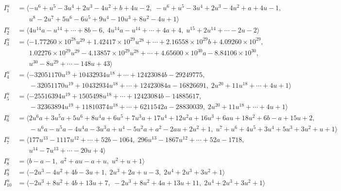 \documentclass[1p]{elsarticle_modified}
\theoremstyle{definition}
\begin{document}
\begin{align*}
I^u_{1}&=\langle 
- u^6+u^5-3 u^4+2 u^3-4 u^2+b+4 u-2,\;- u^6+u^5-3 u^4+2 u^3-4 u^2+a+4 u-1,\\
\phantom{I^u_{1}}&\phantom{= \langle  }u^8-2 u^7+5 u^6-6 u^5+9 u^4-10 u^3+8 u^2-4 u+1\rangle \\
I^u_{2}&=\langle 
4 u^{14} a- u^{14}+\cdots+8 b-6,\;4 u^{14} a- u^{14}+\cdots+4 a+4,\;u^{15}+2 u^{14}+\cdots-2 u-2\rangle \\
I^u_{3}&=\langle 
-1.77260\times10^{28} u^{29}+1.42417\times10^{29} u^{28}+\cdots+2.16558\times10^{29} b+4.09260\times10^{29},\\
\phantom{I^u_{3}}&\phantom{= \langle  }1.02276\times10^{29} u^{29}-4.13857\times10^{29} u^{28}+\cdots+4.65600\times10^{30} a-8.84106\times10^{30},\\
\phantom{I^u_{3}}&\phantom{= \langle  }u^{30}-8 u^{29}+\cdots-148 u+43\rangle \\
I^u_{4}&=\langle 
-32051170 u^{19}+10432934 u^{18}+\cdots+12423084 b-29249775,\\
\phantom{I^u_{4}}&\phantom{= \langle  }-32051170 u^{19}+10432934 u^{18}+\cdots+12423084 a-16826691,\;2 u^{20}+11 u^{18}+\cdots+4 u+1\rangle \\
I^u_{5}&=\langle 
-25516394 u^{19}+1505498 u^{18}+\cdots+12423084 b-14885617,\\
\phantom{I^u_{5}}&\phantom{= \langle  }-32363894 u^{19}+11810374 u^{18}+\cdots+6211542 a-28830039,\;2 u^{20}+11 u^{18}+\cdots+4 u+1\rangle \\
I^u_{6}&=\langle 
2 u^6 a+3 u^5 a+5 u^6+8 u^4 a+6 u^5+7 u^3 a+17 u^4+12 u^2 a+16 u^3+6 a u+18 u^2+6 b- a+15 u+2,\\
\phantom{I^u_{6}}&\phantom{= \langle  }- u^6 a- u^5 a-4 u^4 a-3 u^3 a+u^4-5 u^2 a+a^2-2 a u+2 u^2+1,\;u^7+u^6+4 u^5+3 u^4+5 u^3+3 u^2+u+1\rangle \\
I^u_{7}&=\langle 
177 u^{13}-1117 u^{12}+\cdots+52 b-1064,\;296 u^{13}-1867 u^{12}+\cdots+52 a-1718,\\
\phantom{I^u_{7}}&\phantom{= \langle  }u^{14}-7 u^{13}+\cdots-20 u+4\rangle \\
I^u_{8}&=\langle 
b- a-1,\;a^2+a u- a+u,\;u^2+u+1\rangle \\
I^u_{9}&=\langle 
-2 u^3-4 u^2+4 b-3 u+1,\;2 u^3+2 a+u-3,\;2 u^4+2 u^3+3 u^2+1\rangle \\
I^u_{10}&=\langle 
-2 u^3+8 u^2+4 b+13 u+7,\;-2 u^3+8 u^2+4 a+13 u+11,\;2 u^4+2 u^3+3 u^2+1\rangle \\
\end{align*}\\
\end{document}
